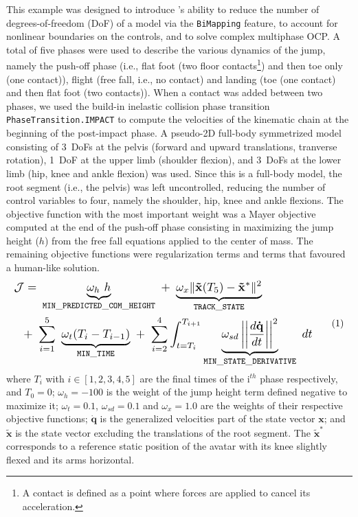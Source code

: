 This example was designed to introduce \bioptim's ability to reduce the number of degrees-of-freedom (DoF) of a model via the \texttt{BiMapping} feature, to account for nonlinear boundaries on the controls, and to solve complex multiphase OCP.
A total of five phases were used to describe the various dynamics of the jump, namely the push-off phase (i.e., flat foot (two floor contacts\footnote{A contact is defined as a point where forces are applied to cancel its acceleration.}) and then toe only (one contact)), flight (free fall, i.e., no contact) and landing (toe (one contact) and then flat foot (two contacts)).
When a contact was added between two phases, we used the build-in inelastic collision phase transition \texttt{PhaseTransition.IMPACT} to compute the velocities of the kinematic chain at the beginning of the post-impact phase.
A pseudo-2D full-body symmetrized model consisting of 3~DoFs at the pelvis (forward and upward translations, tranverse rotation), 1~DoF at the upper limb (shoulder flexion), and 3~DoFs at the lower limb (hip, knee and ankle flexion) was used.
Since this is a full-body model, the root segment (i.e., the pelvis) was left uncontrolled, reducing the number of control variables to four, namely the shoulder, hip, knee and ankle flexions. 
The objective function with the most important weight was a Mayer objective computed at the end of the push-off phase consisting in maximizing the jump height ($h$) from the free fall equations applied to the center of mass.
The remaining objective functions were regularization terms and terms that favoured a human-like solution. 
\[ 
  \resizebox{0.90\columnwidth}{!}{$ 
  \begin{aligned}
  \mathcal{J} = &~\underbrace{\omega_h~h}_{\mathtt{MIN\_PREDICTED\_COM\_HEIGHT}}~+~\underbrace{\omega_{x} \| \mathbf{\tilde{x}}(T_5) - \mathbf{\tilde{x}}^*\|^2}_{\mathtt{TRACK\_STATE}}\\
  +~&\sum^5_{i=1}~\underbrace{\omega_{t}(T_i - T_{i-1})}_{\mathtt{MIN\_TIME}}~
    +~\sum_{i=2}^4\int_{t=T_i}^{T_{i+1}}\underbrace{\omega_{sd}\left|\left|\frac{d\mathbf{\dot{q}}}{dt}\right|\right|^2}_{\mathtt{MIN\_STATE\_DERIVATIVE}}~dt
  \end{aligned}  
  $} 
  \addtag  
  \label{eq:cost_jumper}
\]
where $T_i$ with $i \in [1, 2, 3, 4, 5]$ are the final times of the i$^{th}$ phase respectively, and $T_0=0$; 
$\omega_h=-100$ is the weight of the jump height term defined negative to maximize it; 
$\omega_t=0.1$, $\omega_{sd}=0.1$ and $\omega_x=1.0$ are the weights of their respective objective functions; 
$\mathbf{\dot{q}}$ is the generalized velocities part of the state vector $\mathbf{x}$; 
and $\mathbf{\tilde{x}}$ is the state vector excluding the translations of the root segment. 
The $\mathbf{\tilde{x}}^*$ corresponds to a reference static position of the avatar with its knee slightly flexed and its arms horizontal.

